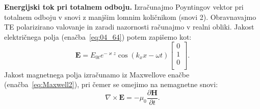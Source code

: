 \begin{example}{\bf Energijski tok pri totalnem odboju.}
\label{primer:04_S}
Izračunajmo Poyntingov vektor pri totalnem odboju v snovi z manjšim 
lomnim količnikom (snovi 2). Obravnavajmo TE polarizirano valovanje in 
zaradi nazornosti računajmo v realni obliki. Jakost električnega
polja (enačba~\ref{eq:04_64}) potem zapišemo kot:
\begin{equation}
\mathbf{E} = 
E_{0t} e^{-\varkappa z}\cos(k_xx-\omega t)
\left[
\begin{array}{c}
0\\
1\\
0\\
\end{array}
\right]\!\!.
 \label{eq:04_71}
\end{equation}
Jakost magnetnega polja izračunamo iz Maxwellove enačbe (enačba~\ref{eq:Maxwell2}), pri 
čemer se omejimo na nemagnetne snovi:
\begin{equation}
\nabla \times \mathbf{E} = -\mu_0 \frac{\partial \mathbf{H}}{\partial t}.
\label{eq:04_72}
\end{equation}


\end{example}
